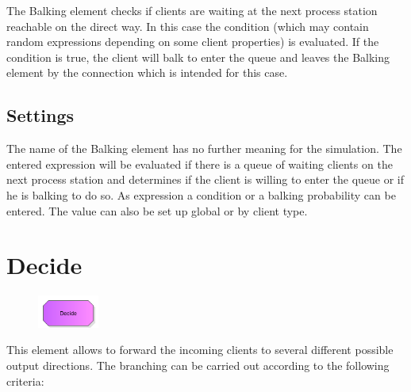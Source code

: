 The Balking element checks if clients are waiting at the next process station reachable
on the direct way. In this case the condition (which may contain random expressions depending
on some client properties) is evaluated. If the condition is true, the client will balk to
enter the queue and leaves the Balking element by the connection which is intended for this
case.

\subsection*{Settings}

The name of the Balking element has no further meaning for the simulation.
The entered expression will be evaluated if there is a queue of waiting
clients on the next process station and determines if the client is willing
to enter the queue or if he is balking to do so. As expression a condition or
a balking probability can be entered. The value can also be set up global or
by client type.


\section{Decide}
\label{ref:ModelElementDecide}

\begin{figure}
\vspace{-22pt}
\includegraphics[width=2cm]{imageModelElementDecide.png}
\vspace{-22pt}
\end{figure}

This element allows to forward the incoming clients to several different possible output directions.
The branching can be carried out according to the following criteria:

